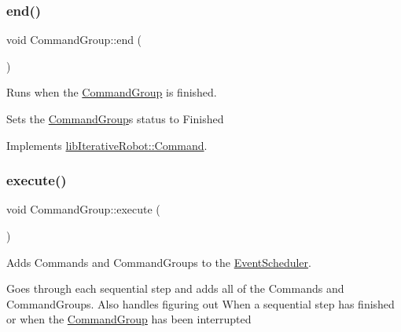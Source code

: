 \mbox{\label{classlib_iterative_robot_1_1_command_group_a28ad3a1c2f6b4f9aea10efa1a824895e}} 
\subsubsection{\texorpdfstring{end()}{end()}}
{\footnotesize\ttfamily void Command\+Group\+::end (\begin{DoxyParamCaption}{ }\end{DoxyParamCaption})\hspace{0.3cm}{\ttfamily [virtual]}}



Runs when the \mbox{\hyperlink{classlib_iterative_robot_1_1_command_group}{Command\+Group}} is finished. 

Sets the \mbox{\hyperlink{classlib_iterative_robot_1_1_command_group}{Command\+Group}}\textquotesingle{}s status to Finished 

Implements \mbox{\hyperlink{classlib_iterative_robot_1_1_command_ab30847f09859387b70bb7846f7ce7ca4}{lib\+Iterative\+Robot\+::\+Command}}.

\mbox{\label{classlib_iterative_robot_1_1_command_group_a5e91d370cafde43548d79945ccb4d8fe}} 
\subsubsection{\texorpdfstring{execute()}{execute()}}
{\footnotesize\ttfamily void Command\+Group\+::execute (\begin{DoxyParamCaption}{ }\end{DoxyParamCaption})\hspace{0.3cm}{\ttfamily [virtual]}}



Adds Commands and Command\+Groups to the \mbox{\hyperlink{classlib_iterative_robot_1_1_event_scheduler}{Event\+Scheduler}}. 

Goes through each sequential step and adds all of the Commands and Command\+Groups. Also handles figuring out When a sequential step has finished or when the \mbox{\hyperlink{classlib_iterative_robot_1_1_command_group}{Command\+Group}} has been interrupted 

